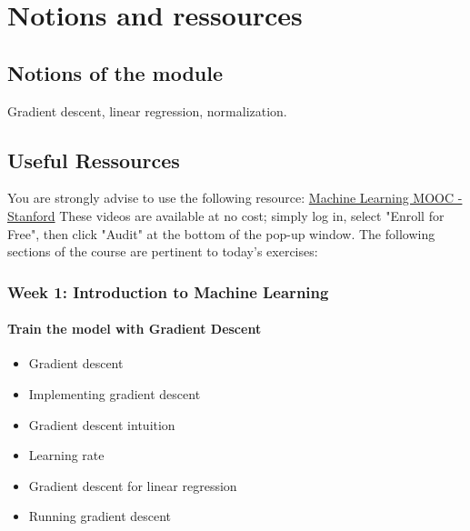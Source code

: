 

\chapter*{Notions and ressources}

\section*{Notions of the module}
Gradient descent, linear regression, normalization.

\section*{Useful Ressources}

You are strongly advise to use the following resource:
\href{https://www.coursera.org/learn/machine-learning}{Machine Learning MOOC - Stanford}
These videos are available at no cost; simply log in, select "Enroll for Free", then click "Audit" at the bottom of the pop-up window.
The following sections of the course are pertinent to today's exercises: 

\newpage

\subsection*{Week 1: Introduction to Machine Learning}

\subsubsection*{Train the model with Gradient Descent}
\begin{itemize}
  \item Gradient descent
  \item Implementing gradient descent
  \item Gradient descent intuition
  \item Learning rate
  \item Gradient descent for linear regression
  \item Running gradient descent
\end{itemize}
    
